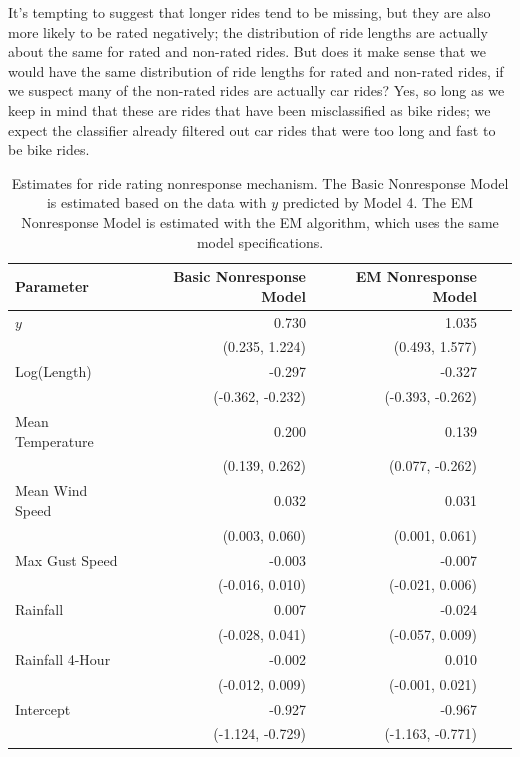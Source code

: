 \documentclass[12pt,twoside]{reedthesis}
\begin{document}
  It's tempting to suggest that longer rides tend to be missing, but they
  are also more likely to be rated negatively; the distribution of ride
  lengths are actually about the same for rated and non-rated rides. But
  does it make sense that we would have the same distribution of ride
  lengths for rated and non-rated rides, if we suspect many of the
  non-rated rides are actually car rides? Yes, so long as we keep in mind
  that these are rides that have been misclassified as bike rides; we
  expect the classifier already filtered out car rides that were too long
  and fast to be bike rides.
  
  \begin{table}[htb]
  \caption[Estimates for ride rating nonresponse mechanism]{
  Estimates for ride rating nonresponse mechanism. The Basic Nonresponse
  Model is estimated based on the data with $y$ predicted by Model 4. The EM 
  Nonresponse Model is estimated with the EM algorithm, which uses the same
  model specifications. \label{tab:nonresponse-estimates}}
  \centering
  \begin{tabular}{lrrrr}
  \toprule
  \textbf{Parameter} & \textbf{Basic Nonresponse Model} & \textbf{EM Nonresponse Model}\\
  \midrule
  $y$ & 0.730 & 1.035\\
  & \footnotesize (0.235, 1.224) & \footnotesize (0.493, 1.577) \\
  Log(Length) & -0.297 & -0.327\\
  & \footnotesize (-0.362, -0.232) & \footnotesize (-0.393, -0.262)\\
  Mean Temperature & 0.200 & 0.139\\
  & \footnotesize (0.139, 0.262) & \footnotesize (0.077, -0.262)\\
  Mean Wind Speed & 0.032 & 0.031\\
  & \footnotesize (0.003, 0.060) & \footnotesize (0.001, 0.061) \\
  Max Gust Speed & -0.003 & -0.007\\
  & \footnotesize (-0.016, 0.010) & \footnotesize (-0.021, 0.006) \\
  Rainfall & 0.007 & -0.024\\
  & \footnotesize (-0.028, 0.041) & \footnotesize (-0.057, 0.009)\\
  Rainfall 4-Hour & -0.002 & 0.010\\
  & \footnotesize (-0.012, 0.009) & \footnotesize (-0.001, 0.021) \\
  Intercept & -0.927 & -0.967\\
  & \footnotesize (-1.124, -0.729) & \footnotesize (-1.163, -0.771)\\
  \bottomrule
  \end{tabular}
  \end{table}
  
\end{document}

